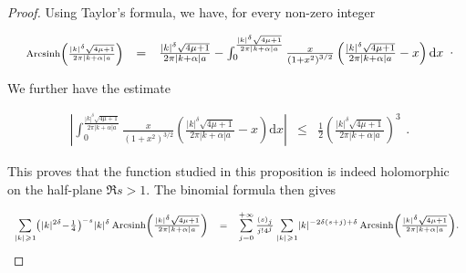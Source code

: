 \documentclass{jams-l}
\theoremstyle{definition}
\theoremstyle{remark}
\numberwithin{equation}{section}
\DeclareMathOperator{\arcsinh}{Arcsinh}
\begin{document}
            \begin{proof}
            
                Using Taylor's formula, we have, for every non-zero integer
                
                \[ \begin{array}{lll}
                        \scriptstyle \arcsinh \left( \frac{\left \vert k \right \vert^{\delta} \sqrt{4 \mu + 1}}{2 \pi \left \vert k + \alpha \right \vert a} \right) & \scriptsize = & \scriptsize \frac{\left \vert k \right \vert^{\delta} \sqrt{4 \mu + 1}}{2 \pi \left \vert k + \alpha \right \vert a} - \int_0^{\frac{\left \vert k \right \vert^{\delta} \sqrt{4 \mu + 1}}{2 \pi \left \vert k + \alpha \right \vert a}} \frac{x}{\left( 1 + x^2 \right)^{3/2}} \left( \frac{\left \vert k \right \vert^{\delta} \sqrt{4 \mu + 1}}{2 \pi \left \vert k + \alpha \right \vert a} - x \right) \mathrm{d}x
                    \end{array} . \]
                
                \noindent We further have the estimate
                
                \[ \begin{array}{lll}
                        \scriptstyle \left \vert \int_0^{\frac{\left \vert k \right \vert^{\delta} \sqrt{4 \mu + 1}}{2 \pi \left \vert k + \alpha \right \vert a}} \frac{x}{\left( 1 + x^2 \right)^{3/2}} \left( \frac{\left \vert k \right \vert^{\delta} \sqrt{4 \mu + 1}}{2 \pi \left \vert k + \alpha \right \vert a} - x \right) \mathrm{d}x \right \vert & \scriptstyle \leqslant & \scriptstyle \frac{1}{2} \left( \frac{\left \vert k \right \vert^{\delta} \sqrt{4 \mu + 1}}{2 \pi \left \vert k + \alpha \right \vert a} \right)^3
                    \end{array} . \]
                
                \noindent This proves that the function studied in this proposition is indeed holomorphic on the half-plane $\Re s > 1$. The binomial formula then gives
                
                \[ \begin{array}{lll}
                        \scriptstyle \sum\limits_{\left \vert k \right \vert \geqslant 1} \left( \left \vert k \right \vert^{2 \delta} - \frac{1}{4} \right)^{-s} \left \vert k \right \vert^{\delta} \arcsinh \left( \frac{\left \vert k \right \vert^{\delta} \sqrt{4 \mu + 1}}{2 \pi \left \vert k + \alpha \right \vert a} \right) & \hspace{-1pt} \scriptstyle = \hspace{-1pt} & \scriptstyle \sum\limits_{j = 0}^{+ \infty} \frac{\left( s \right)_j}{j! 4^{j}} \sum\limits_{\left \vert k \right \vert \geqslant 1}  \left \vert k \right \vert^{-2 \delta \left( s + j \right) + \delta} \arcsinh \left( \frac{\left \vert k \right \vert^{\delta} \sqrt{4 \mu + 1}}{2 \pi \left \vert k + \alpha \right \vert a} \right).
                    \end{array} \]
                

\end{proof}
\end{document}
